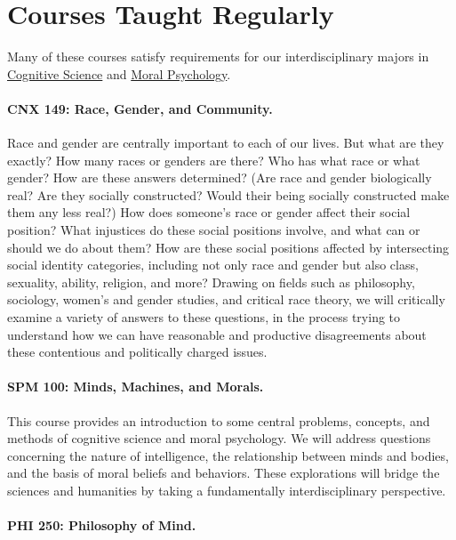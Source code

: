 \documentclass[11pt]{article}
\begin{document}
\section[Courses]{Courses Taught Regularly}

Many of these courses satisfy requirements for our interdisciplinary majors in \href{https://www.fandm.edu/fields-of-study/cognitive-science/}{Cognitive Science} and \href{https://www.fandm.edu/fields-of-study/moral-psychology/}{Moral Psychology}.
\medskip{}

\paragraph{CNX 149: Race, Gender, and Community.}

Race and gender are centrally important to each of our lives. But what are they exactly? How many races or genders are there? Who has what race or what gender? How are these answers determined? (Are race and gender biologically real? Are they socially constructed? Would their being socially constructed make them any less real?) How does someone's race or gender affect their social position? What injustices do these social positions involve, and what can or should we do about them? How are these social positions affected by intersecting social identity categories, including not only race and gender but also class, sexuality, ability, religion, and more? Drawing on fields such as philosophy, sociology, women's and gender studies, and critical race theory, we will critically examine a variety of answers to these questions, in the process trying to understand how we can have reasonable and productive disagreements about these contentious and politically charged issues.

\paragraph{SPM 100: Minds, Machines, and Morals.}

This course provides an introduction to some central problems, concepts, and methods of cognitive science and moral psychology. We will address questions concerning the nature of intelligence, the relationship between minds and bodies, and the basis of moral beliefs and behaviors. These explorations will bridge the sciences and humanities by taking a fundamentally interdisciplinary perspective.

\paragraph{PHI 250: Philosophy of Mind.}
\end{document}
